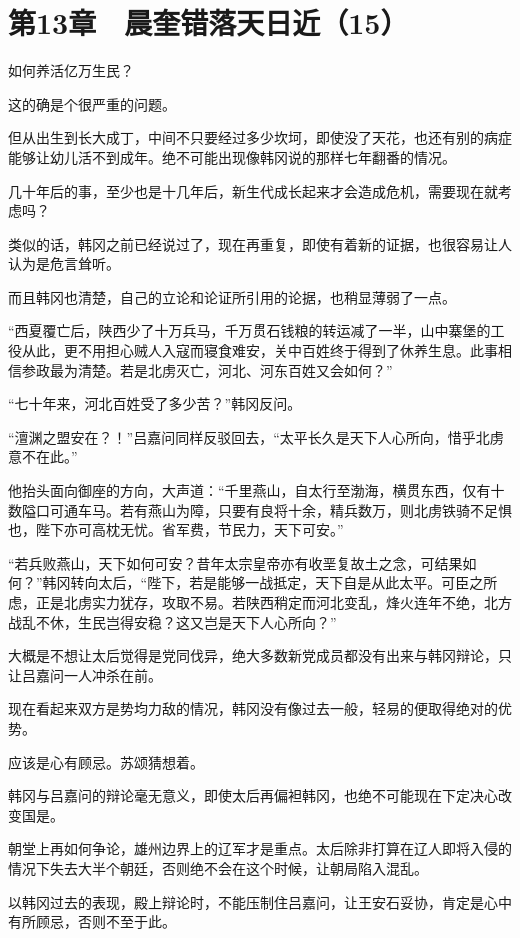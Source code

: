 \section{第13章　晨奎错落天日近（15）}

如何养活亿万生民？

这的确是个很严重的问题。

但从出生到长大成丁，中间不只要经过多少坎坷，即使没了天花，也还有别的病症能够让幼儿活不到成年。绝不可能出现像韩冈说的那样七年翻番的情况。

几十年后的事，至少也是十几年后，新生代成长起来才会造成危机，需要现在就考虑吗？

类似的话，韩冈之前已经说过了，现在再重复，即使有着新的证据，也很容易让人认为是危言耸听。

而且韩冈也清楚，自己的立论和论证所引用的论据，也稍显薄弱了一点。

“西夏覆亡后，陕西少了十万兵马，千万贯石钱粮的转运减了一半，山中寨堡的工役从此，更不用担心贼人入寇而寝食难安，关中百姓终于得到了休养生息。此事相信参政最为清楚。若是北虏灭亡，河北、河东百姓又会如何？”

“七十年来，河北百姓受了多少苦？”韩冈反问。

“澶渊之盟安在？！”吕嘉问同样反驳回去，“太平长久是天下人心所向，惜乎北虏意不在此。”

他抬头面向御座的方向，大声道：“千里燕山，自太行至渤海，横贯东西，仅有十数隘口可通车马。若有燕山为障，只要有良将十余，精兵数万，则北虏铁骑不足惧也，陛下亦可高枕无忧。省军费，节民力，天下可安。”

“若兵败燕山，天下如何可安？昔年太宗皇帝亦有收垩复故土之念，可结果如何？”韩冈转向太后，“陛下，若是能够一战抵定，天下自是从此太平。可臣之所虑，正是北虏实力犹存，攻取不易。若陕西稍定而河北变乱，烽火连年不绝，北方战乱不休，生民岂得安稳？这又岂是天下人心所向？”

大概是不想让太后觉得是党同伐异，绝大多数新党成员都没有出来与韩冈辩论，只让吕嘉问一人冲杀在前。

现在看起来双方是势均力敌的情况，韩冈没有像过去一般，轻易的便取得绝对的优势。

应该是心有顾忌。苏颂猜想着。

韩冈与吕嘉问的辩论毫无意义，即使太后再偏袒韩冈，也绝不可能现在下定决心改变国是。

朝堂上再如何争论，雄州边界上的辽军才是重点。太后除非打算在辽人即将入侵的情况下失去大半个朝廷，否则绝不会在这个时候，让朝局陷入混乱。

以韩冈过去的表现，殿上辩论时，不能压制住吕嘉问，让王安石妥协，肯定是心中有所顾忌，否则不至于此。

